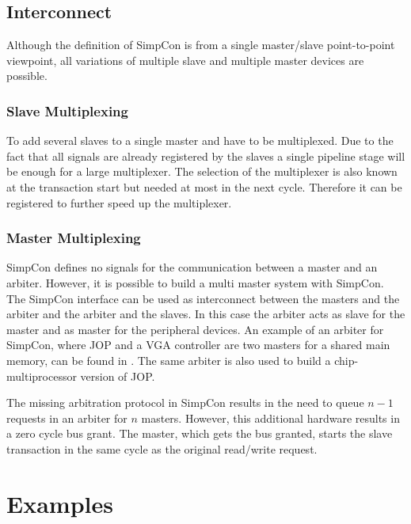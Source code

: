 \subsection{Interconnect}

Although the definition of SimpCon is from a single master/slave
point-to-point viewpoint, all variations of multiple slave and
multiple master devices are possible.

\subsubsection{Slave Multiplexing}

To add several slaves to a single master  and
 have to be multiplexed. Due to the fact that all
 signals are already registered by the slaves a
single pipeline stage will be enough for a large multiplexer. The
selection of the multiplexer is also known at the transaction start
but needed at most in the next cycle. Therefore it can be registered
to further speed up the multiplexer.


\subsubsection{Master Multiplexing}

SimpCon defines no signals for the communication between a master
and an arbiter. However, it is possible to build a multi master
system with SimpCon. The SimpCon interface can be used as
interconnect between the masters and the arbiter and the arbiter and
the slaves. In this case the arbiter acts as slave for the master
and as master for the peripheral devices. An example of an arbiter
for SimpCon, where JOP and a VGA controller are two masters for a
shared main memory, can be found in \cite{jop:dma}. The same arbiter
is also used to build a chip-multiprocessor version of JOP.

The missing arbitration protocol in SimpCon results in the need to
queue $n-1$ requests in an arbiter for $n$ masters. However, this
additional hardware results in a zero cycle bus grant. The master,
which gets the bus granted, starts the slave transaction in the same
cycle as the original read/write request.



\section{Examples}

